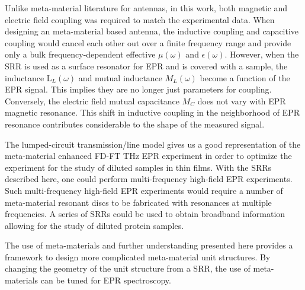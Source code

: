Unlike meta-material literature for antennas, in this work, both magnetic and electric field coupling was required to match the experimental data. When designing an meta-material based antenna, the inductive coupling and capacitive coupling would cancel each other out over a finite frequency range and provide only a bulk frequency-dependent effective $\mu(\omega)$ and $\epsilon(\omega)$. However, when the SRR is used as a surface resonator for EPR and is covered with a sample, the inductance L$_L(\omega)$ and mutual inductance $M_L(\omega)$ become a function of the EPR signal. This implies they are no longer just parameters for coupling. Conversely, the electric field mutual capacitance $M_C$ does not vary with EPR magnetic resonance. This shift in inductive coupling in the neighborhood of EPR resonance contributes considerable to the shape of the measured signal.

The lumped-circuit transmission\-/line model gives us a good representation of the meta-material enhanced FD-FT THz EPR experiment in order to optimize the experiment for the study of diluted samples in thin films. With the SRRs described here, one could perform multi-frequency high-field EPR experiments. \cite{KRZYSTEK2006,Telser2014} Such multi-frequency high-field EPR experiments would require a number of meta-material resonant discs to be fabricated with resonances at multiple frequencies. A series of SRRs could be used to obtain broadband information allowing for the study of diluted protein samples.

The use of meta-materials and further understanding presented here provides a framework to design more complicated meta-material unit structures. By changing the geometry of the unit structure from a SRR, the use of meta-materials can be tuned for EPR spectroscopy. \cite{ZhangMetasurfaces}


{\renewcommand{\bibsection}{\clearpage\section*{\bibname}\markboth{\bibname}{\bibname}}
\renewcommand{\bibname}{CHAPTER 4. REFERENCES}


}